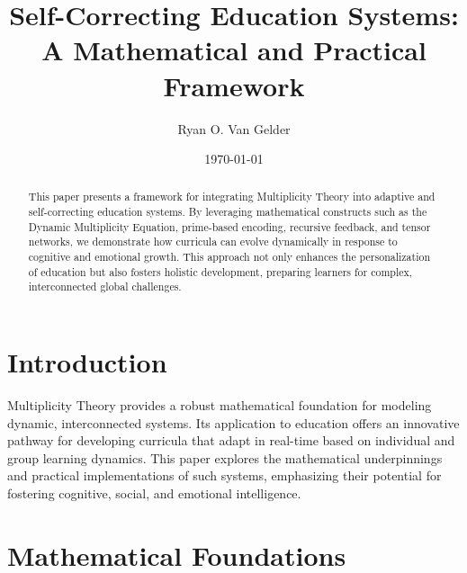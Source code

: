 \documentclass{article}
\theoremstyle{plain}
\begin{document}
\title{Self-Correcting Education Systems: \\ A Mathematical and Practical Framework}

\author{Ryan O. Van Gelder}
\date{\today}
\maketitle

\begin{abstract}
This paper presents a framework for integrating Multiplicity Theory into adaptive and self-correcting education systems. By leveraging mathematical constructs such as the Dynamic Multiplicity Equation, prime-based encoding, recursive feedback, and tensor networks, we demonstrate how curricula can evolve dynamically in response to cognitive and emotional growth. This approach not only enhances the personalization of education but also fosters holistic development, preparing learners for complex, interconnected global challenges.
\end{abstract}

\section{Introduction}
Multiplicity Theory provides a robust mathematical foundation for modeling dynamic, interconnected systems. Its application to education offers an innovative pathway for developing curricula that adapt in real-time based on individual and group learning dynamics. This paper explores the mathematical underpinnings and practical implementations of such systems, emphasizing their potential for fostering cognitive, social, and emotional intelligence.

\section{Mathematical Foundations}
\end{document}
